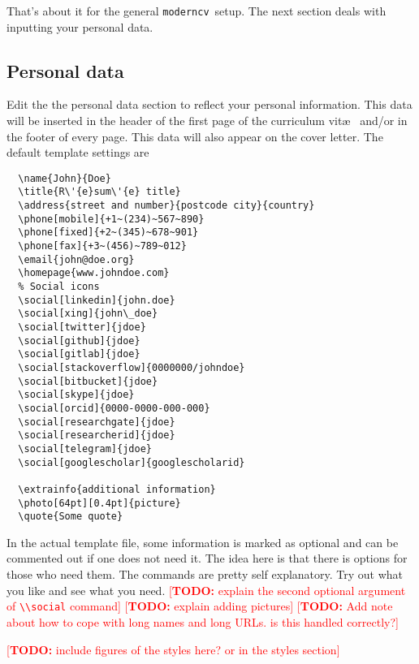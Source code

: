 \documentclass[a4paper,11pt]{article}
\newcommand{\todox}[1]{\textcolor{red}{[\textbf{TODO:} #1]}}
\newcommand{\code}[1]{\lstinline!#1!}
\newcommand{\Code}[1]{\lstinline!#1!~} %
\newcommand{\Moderncv}{\Code{moderncv}}
\begin{document}
That's about it for the general \Moderncv setup. 
The next section deals with inputting your personal data.

\subsection{Personal data}
Edit the the personal data section to reflect your personal information. This data will be inserted in the header of the first page of the curriculum vit\ae~ and/or in the footer of every page. 
This data will also appear on the cover letter. 
The default template settings are

\begin{lstlisting}
  \name{John}{Doe}
  \title{R\'{e}sum\'{e} title}
  \address{street and number}{postcode city}{country}
  \phone[mobile]{+1~(234)~567~890}
  \phone[fixed]{+2~(345)~678~901}
  \phone[fax]{+3~(456)~789~012}
  \email{john@doe.org}
  \homepage{www.johndoe.com}
  % Social icons
  \social[linkedin]{john.doe}
  \social[xing]{john\_doe}               
  \social[twitter]{jdoe}                 
  \social[github]{jdoe}                  
  \social[gitlab]{jdoe}                  
  \social[stackoverflow]{0000000/johndoe}
  \social[bitbucket]{jdoe}               
  \social[skype]{jdoe}                   
  \social[orcid]{0000-0000-000-000}      
  \social[researchgate]{jdoe}            
  \social[researcherid]{jdoe}            
  \social[telegram]{jdoe}                
  \social[googlescholar]{googlescholarid}    

  \extrainfo{additional information}     
  \photo[64pt][0.4pt]{picture}
  \quote{Some quote}                     
\end{lstlisting}
In the actual template file, some information is marked as optional and can be commented out if one does not need it. 
The idea here is that there is options for those who need them. 
The commands are pretty self explanatory. Try out what you like and see what you need.
\todox{explain the second optional argument of \code{\\social} command}
\todox{explain adding pictures}
\todox{Add note about how to cope with long names and long URLs. is this handled correctly?}

\todox{include figures of the styles here? or in the styles section}
\end{document}

